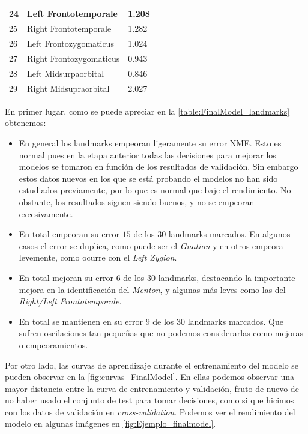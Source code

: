 \begin{table}[!ht]
\begin{tabular}{|l|l|l|}
                24 & Left Frontotemporale & 1.208 \\ \hline
                25 & Right Frontotemporale & 1.282 \\ \hline
                26 & Left Frontozygomaticus & 1.024 \\ \hline
                27 & Right Frontozygomaticus & 0.943 \\ \hline
                28 & Left Midsurpaorbital & 0.846 \\ \hline
                29 & Right Midsupraorbital & 2.027 \\ \hline
            \end{tabular}
            \label{table:FinalModel_landmarks}
        \end{table}
        
        \medskip

        \noindent En primer lugar, como se puede apreciar en la \autoref{table:FinalModel_landmarks} obtenemos: 

        \begin{itemize}
            \item En general los landmarks empeoran ligeramente su error NME. Esto es normal pues en la etapa anterior todas las decisiones para mejorar los modelos se tomaron en función de los resultados de validación. Sin embargo estos datos nuevos en los que se está probando el modelos no han sido estudiados previamente, por lo que es normal que baje el rendimiento. No obstante, los resultados siguen siendo buenos, y no se empeoran excesivamente. 
            \item En total empeoran su error $15$ de los $30$ landmarks marcados. En algunos casos el error se duplica, como puede ser el \textit{Gnation} y en otros empeora levemente, como ocurre con el \textit{Left Zygion}. 
            \item En total mejoran su error $6$ de los $30$ landmarks, destacando la importante mejora en la identificación del \textit{Menton}, y algunas más leves como las del \textit{Right/Left Frontotemporale}.
            \item En total se mantienen en su error $9$ de los $30$ landmarks marcados. Que sufren oscilaciones tan pequeñas que no podemos considerarlas como mejoras o empeoramientos.
        \end{itemize}

        \medskip

        \noindent Por otro lado, las curvas de aprendizaje durante el entrenamiento del modelo se pueden observar en la \autoref{fig:curvas_FinalModel}. En ellas podemos observar una mayor distancia entre la curva de entrenamiento y validación, fruto de nuevo de no haber usado el conjunto de test para tomar decisiones, como si que hicimos con los datos de validación en \textit{cross-validation}. Podemos ver el rendimiento del modelo en algunas imágenes en \autoref{fig:Ejemplo_finalmodel}.

